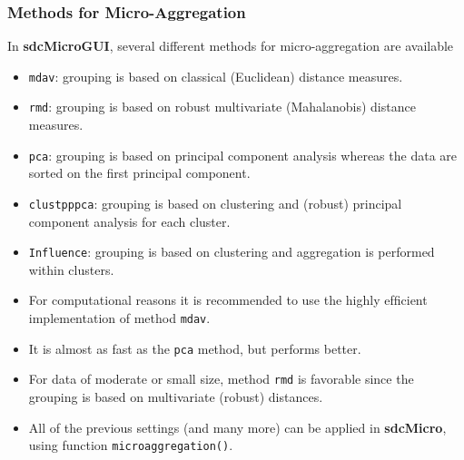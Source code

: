 \documentclass{beamer}
\begin{document}
%
%
\begin{frame}
\frametitle{Methods for Micro-Aggregation}
In \textbf{sdcMicroGUI}, several different methods for micro-aggregation are available
\begin{itemize}
\item \texttt{mdav}: grouping is based on classical (Euclidean) distance measures.
\item \texttt{rmd}: grouping is based on robust multivariate (Mahalanobis) distance measures.
\item \texttt{pca}: grouping is based on principal component analysis whereas the data
are sorted on the ﬁrst principal component.
\item \texttt{clustpppca}: grouping is based on clustering and (robust) principal component analysis for each cluster.


\item \texttt{Influence}: grouping is based on clustering and aggregation is performed within clusters.
\end{itemize}
\end{frame}
\begin{frame}
	\begin{itemize}
\item For computational reasons it is recommended to use the highly efﬁcient implementation of method \texttt{mdav}. 
\item It is almost as fast as the \texttt{pca} method, but performs
better. 
\item For data of moderate or small size, method \texttt{rmd} is favorable since the
grouping is based on multivariate (robust) distances.

\item All of the previous settings (and many more) can be applied in \textbf{sdcMicro}, using
function \texttt{microaggregation()}.
\end{itemize} 
\end{frame}
\end{document}
